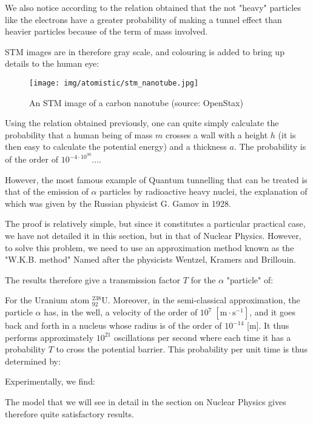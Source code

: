 	We also notice according to the relation obtained that the not "heavy" particles like the electrons have a greater probability of making a tunnel effect than heavier particles because of the term of mass involved.
	
	STM images are in therefore gray scale, and colouring is added to bring up details to the human eye:
	\begin{figure}[H]
		\centering
		\texttt{[image: img/atomistic/stm\_nanotube.jpg]}	
		\caption[An STM image of a carbon nanotube]{An STM image of a carbon nanotube (source: OpenStax)}
	\end{figure}

	Using the relation obtained previously, one can quite simply calculate the probability that a human being of mass $m$ crosses a wall with a height $h$ (it is then easy to calculate the potential energy) and a thickness $a$. The probability is of the order of $10^{-4\cdot 10^{30}}$....

	However, the most famous example of Quantum tunnelling that can be treated is that of the emission of $\alpha$ particles by radioactive heavy nuclei, the explanation of which was given by the Russian physicist G. Gamov in 1928.

	The proof is relatively simple, but since it constitutes a particular practical case, we have not detailed it in this section, but in that of Nuclear Physics. However, to solve this problem, we need to use an approximation method known as the "W.K.B. method" Named after the physicists Wentzel, Kramers and Brillouin.
	
	The results therefore give a transmission factor $T$ for the $\alpha$ "particle" of:
	
	For the Uranium atom $_{92}^{238}\mathrm{U}$. Moreover, in the semi-classical approximation, the particle $\alpha$ has, in the well, a velocity of the order of $10^7\;[\text{m}\cdot\text{s}^{-1}]$, and it goes back and forth in a nucleus whose radius is of the order of $10^{-14}$ [m]. It thus performs approximately $10^{21}$ oscillations per second where each time it has a probability $T$ to cross the potential barrier. This probability per unit time is thus determined by:
	
	Experimentally, we find:
	
	The model that we will see in detail in the section on Nuclear Physics gives therefore quite satisfactory results.
	
